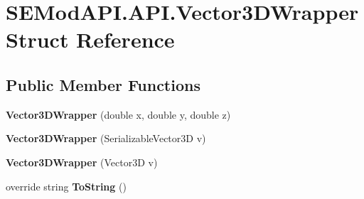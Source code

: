 \hypertarget{struct_s_e_mod_a_p_i_1_1_a_p_i_1_1_vector3_d_wrapper}{}\section{S\+E\+Mod\+A\+P\+I.\+A\+P\+I.\+Vector3\+D\+Wrapper Struct Reference}
\label{struct_s_e_mod_a_p_i_1_1_a_p_i_1_1_vector3_d_wrapper}
\subsection*{Public Member Functions}
\begin{DoxyCompactItemize}
\item 
\hypertarget{struct_s_e_mod_a_p_i_1_1_a_p_i_1_1_vector3_d_wrapper_a1e049927023154bd1d70715e16c4d254}{}{\bfseries Vector3\+D\+Wrapper} (double x, double y, double z)\label{struct_s_e_mod_a_p_i_1_1_a_p_i_1_1_vector3_d_wrapper_a1e049927023154bd1d70715e16c4d254}

\item 
\hypertarget{struct_s_e_mod_a_p_i_1_1_a_p_i_1_1_vector3_d_wrapper_aa386c2fecacc8438a60fc18e178883d1}{}{\bfseries Vector3\+D\+Wrapper} (Serializable\+Vector3\+D v)\label{struct_s_e_mod_a_p_i_1_1_a_p_i_1_1_vector3_d_wrapper_aa386c2fecacc8438a60fc18e178883d1}

\item 
\hypertarget{struct_s_e_mod_a_p_i_1_1_a_p_i_1_1_vector3_d_wrapper_a0c314fa4b3048a203df56b810418fb82}{}{\bfseries Vector3\+D\+Wrapper} (Vector3\+D v)\label{struct_s_e_mod_a_p_i_1_1_a_p_i_1_1_vector3_d_wrapper_a0c314fa4b3048a203df56b810418fb82}

\item 
\hypertarget{struct_s_e_mod_a_p_i_1_1_a_p_i_1_1_vector3_d_wrapper_ab8db5c8437b567de53f6842a54a9efce}{}override string {\bfseries To\+String} ()\label{struct_s_e_mod_a_p_i_1_1_a_p_i_1_1_vector3_d_wrapper_ab8db5c8437b567de53f6842a54a9efce}

\end{DoxyCompactItemize}
